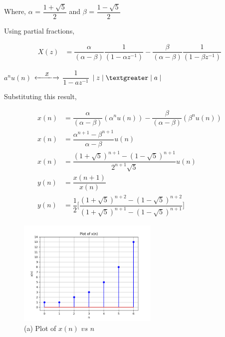 \documentclass[journal,12pt,twocolumn]{IEEEtran}
\theoremstyle{remark}
\begin{document}
	\vspace{0.3cm}
	
	Where, $\alpha$ = $\dfrac{1 +\sqrt{5}}{2}$ and $\beta$ = $\dfrac{1 -\sqrt{5}}{2}$ 
	
	\vspace{0.4cm}
	
	Using partial fractions,
	
	\begin{align}
		X(z) &= \dfrac{\alpha}{(\alpha - \beta)} \dfrac{1}{(1 - \alpha z^{-1})} - \dfrac{\beta}{(\alpha - \beta)} \dfrac{1}{(1 - \beta z^{-1})}
	\end{align}
	
	$a^n u(n)$
	$\xleftarrow[]{\hspace{0.4cm}{\mathcal{Z}}\hspace{0.1cm}}\xrightarrow[]{}$
	$\dfrac{1}{1 - a z^{-1}}$ \hspace{0.2cm} $\lvert \hspace{0.1cm} z \hspace{0.1cm}\rvert \hspace{0.1cm} \textgreater \hspace{0.1cm} \lvert \hspace{0.1cm} a \hspace{0.1cm} \rvert$
	
	\vspace{0.4cm}
	
	Substituting this result,
	
	\vspace{-0.5cm}
	
	\begin{align}
		x(n) &= \dfrac{\alpha}{(\alpha - \beta)} (\alpha^n u(n)) - \dfrac{\beta}{(\alpha - \beta)} (\beta^n u(n))\\[3pt]
		x(n) &= \dfrac{\alpha^{n+1} - \beta^{n+1} }{\alpha - \beta} u(n)\\[10pt]
		x(n) &= \dfrac{(1 + \sqrt{5})^{n+1} - (1 - \sqrt{5})^{n+1} }{2^{n+1} \sqrt{5}} u(n)\\[10pt]
		y(n) &= \dfrac{x(n+1)}{x(n)}\\[10pt]
		y(n) &= \dfrac{1}{2} \Bigg[ \dfrac{(1 + \sqrt{5})^{n+2} - (1 - \sqrt{5})^{n+2}}{(1 + \sqrt{5})^{n+1} - (1 - \sqrt{5})^{n+1}} \Bigg]
	\end{align}
	
	\begin{figure}[htbp]
		\centering
		\includegraphics[width=0.6\textwidth]{ncert-maths/11/9/1/14/figures/fig1.png}
		\caption*{\hspace{2cm} (a) Plot of $x(n)$ $vs$ $n$}
	\end{figure}
	
\end{document}

